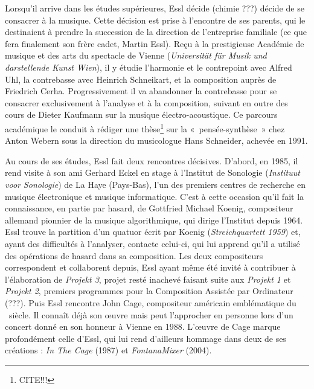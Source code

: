 \documentclass[a4paper,12pt]{article}
\newcommand{\guill}[1]{«~#1~»}
\begin{document}
Lorsqu'il arrive dans les études supérieures, Essl décide (chimie ???) décide de se consacrer à la musique. Cette décision est prise à l'encontre de ses parents, qui le destinaient à prendre la succession de la direction de l'entreprise familiale (ce que fera finalement son frère cadet, Martin Essl). Reçu à la prestigieuse Académie de musique et des arts du spectacle de Vienne (\emph{Universität für Musik und darstellende Kunst Wien}), il y étudie l'harmonie et le contrepoint avec Alfred Uhl, la contrebasse avec Heinrich Schneikart, et la composition auprès de Friedrich Cerha. Progressivement il va abandonner la contrebasse pour se consacrer exclusivement à l'analyse et à la composition, suivant en outre des cours de Dieter Kaufmann sur la musique électro-acoustique. 	Ce parcours académique le conduit à rédiger une thèse\footnote{CITE!!!} sur la \guill{pensée-synthèse} chez Anton Webern sous la direction du musicologue Hans Schneider, achevée en 1991.

Au cours de ses études, Essl fait deux rencontres décisives. D'abord, en 1985, il rend visite à son ami Gerhard Eckel en stage à l'Institut de Sonologie (\emph{Instituut voor Sonologie}) de La Haye (Pays-Bas), l'un des premiers centres de recherche en musique électronique et musique informatique. C'est à cette occasion qu'il fait la connaissance, en partie par hasard, de Gottfried Michael Koenig, compositeur allemand pionnier de la musique algorithmique, qui dirige l'Institut depuis 1964. Essl trouve la partition d'un quatuor écrit par Koenig (\emph{Streichquartett 1959}) et, ayant des difficultés à l'analyser, contacte celui-ci, qui lui apprend qu'il a utilisé des opérations de hasard dans sa composition. Les deux compositeurs correspondent et collaborent depuis, Essl ayant même été invité à contribuer à l'élaboration de \emph{Projekt 3}, projet resté inachevé faisant suite aux \emph{Projekt 1} et \emph{Projekt 2}, premiers programmes pour la Composition Assistée par Ordinateur (???). Puis Essl rencontre John Cage, compositeur américain emblématique du \XXe~siècle. Il connaît déjà son œuvre mais peut l'approcher en personne lors d'un concert donné en son honneur à Vienne en 1988. L'œuvre de Cage marque profondément celle d'Essl, qui lui rend d'ailleurs hommage dans deux de ses créations : \emph{In The Cage} (1987) et \emph{FontanaMixer} (2004).
\end{document}
